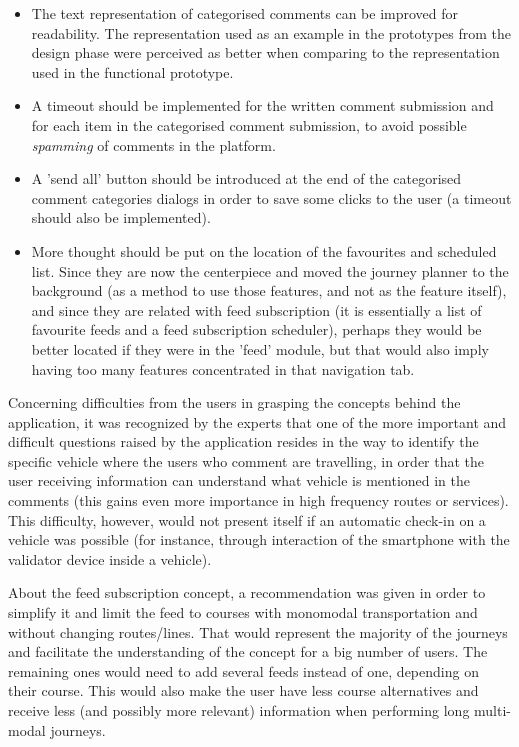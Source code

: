 \begin{itemize}
\item The text representation of categorised comments can be improved for readability. The representation used as an example in the prototypes from the design phase were perceived as better when comparing to the representation used in the functional prototype.

\item A timeout should be implemented for the written comment submission and for each item in the categorised comment submission, to avoid possible \emph{spamming} of comments in the platform.

\item A 'send all' button should be introduced at the end of the categorised comment categories dialogs in order to save some clicks to the user (a timeout should also be implemented).

\item More thought should be put on the location of the favourites and scheduled list. Since they are now the centerpiece and moved the journey planner to the background (as a method to use those features, and not as the feature itself), and since they are related with feed subscription (it is essentially a list of favourite feeds and a feed subscription scheduler), perhaps they would be better located if they were in the 'feed' module, but that would also imply having too many features concentrated in that navigation tab.
\end{itemize}

Concerning difficulties from the users in grasping the concepts behind the application, it was recognized by the experts that one of the more important and difficult questions raised by the application resides in the way to identify the specific vehicle where the users who comment are travelling, in order that the user receiving information can understand what vehicle is mentioned in the comments (this gains even more importance in high frequency routes or services). This difficulty, however, would not present itself if an automatic check-in on a vehicle was possible (for instance, through interaction of the smartphone with the validator device inside a vehicle). 


About the feed subscription concept, a recommendation was given in order to simplify it and limit the feed to courses with monomodal transportation and without changing routes/lines. That would represent the majority of the journeys and facilitate the understanding of the concept for a big number of users. The remaining ones would need to add several feeds instead of one, depending on their course. This would also make the user have less course alternatives and receive less (and possibly more relevant) information when performing long multi-modal journeys.

